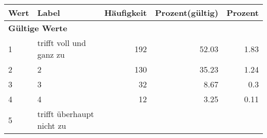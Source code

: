      \begin{longtable}{lXrrr}
     \toprule
     \textbf{Wert} & \textbf{Label} & \textbf{Häufigkeit} & \textbf{Prozent(gültig)} & \textbf{Prozent} \\
     \endhead
     \midrule
     \multicolumn{5}{l}{\textbf{Gültige Werte}}\\

     1 &
     \multicolumn{1}{X}{ trifft voll und ganz zu   } &


       \num{192} &
       \num[round-mode=places,round-precision=2]{52,03} &
         \num[round-mode=places,round-precision=2]{1,83} \\

     2 &
     \multicolumn{1}{X}{ 2   } &


       \num{130} &
       \num[round-mode=places,round-precision=2]{35,23} &
         \num[round-mode=places,round-precision=2]{1,24} \\

     3 &
     \multicolumn{1}{X}{ 3   } &


       \num{32} &
       \num[round-mode=places,round-precision=2]{8,67} &
         \num[round-mode=places,round-precision=2]{0,3} \\

     4 &
     \multicolumn{1}{X}{ 4   } &


       \num{12} &
       \num[round-mode=places,round-precision=2]{3,25} &
         \num[round-mode=places,round-precision=2]{0,11} \\

     5 &
     \multicolumn{1}{X}{ trifft überhaupt nicht zu   } &



\end{longtable}
